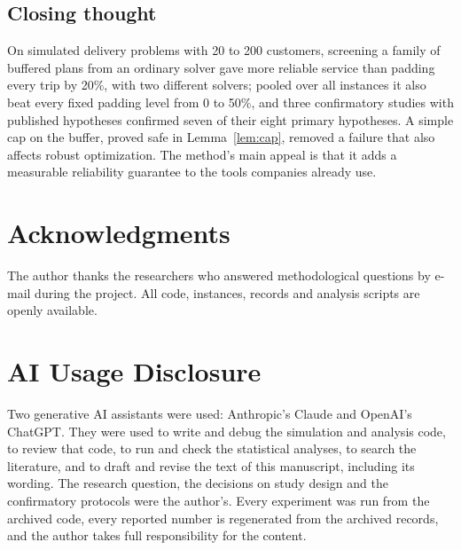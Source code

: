 \documentclass[12pt,letterpaper]{article}
\newif\ifanonymous
\newcommand{\refsfile}{nhsjs_refs}
\begin{document}
\subsection{Closing thought}

On simulated delivery problems with 20 to 200 customers, screening a family of
buffered plans from an ordinary solver gave more reliable service than padding every
trip by 20\%, with two different solvers; pooled over all instances it also beat
every fixed padding level from 0 to 50\%, and three confirmatory studies with
published hypotheses confirmed seven of their eight primary hypotheses. A simple cap
on the buffer, proved safe in Lemma~\ref{lem:cap}, removed a failure that also
affects robust optimization. The method's main appeal is that it adds a measurable
reliability guarantee to the tools companies already use.

\ifanonymous\else
\section*{Acknowledgments}
The author thanks the researchers who answered methodological questions by e-mail
during the project. All code, instances, records and analysis scripts are openly
available\cite{ali2026archive}.
\fi

\section*{AI Usage Disclosure}
Two generative AI assistants were used: Anthropic's Claude and OpenAI's ChatGPT.
They were used to write and debug the simulation and analysis code, to review that
code, to run and check the statistical analyses, to search the literature, and to
draft and revise the text of this manuscript, including its wording. The research
question, the decisions on study design and the confirmatory protocols were the
author's. Every experiment was run from the archived code, every reported number is
regenerated from the archived records, and the author takes full responsibility for
the content.



\end{document}
